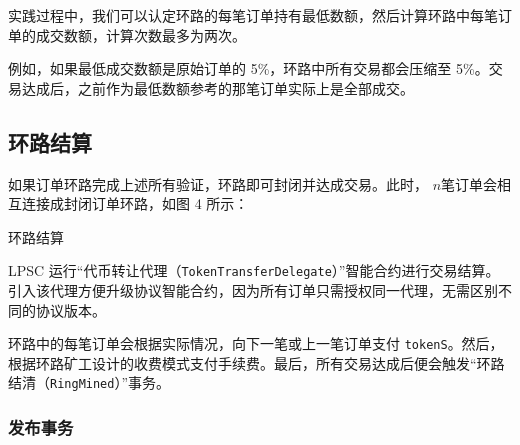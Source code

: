 \documentclass[UTF8,nofonts]{ctexart}%
\makeatletter
\newenvironment{figurehere}
 {\def\@captype{figure}}
 {}
\makeatother
\begin{document}
\begin{multicols}{2}
实践过程中，我们可以认定环路的每笔订单持有最低数额，然后计算环路中每笔订单的成交数额，计算次数最多为两次。

例如，如果最低成交数额是原始订单的 5\%，环路中所有交易都会压缩至 5\%。交易达成后，之前作为最低数额参考的那笔订单实际上是全部成交。


\subsection{环路结算\label{sec:settlement}}

如果订单环路完成上述所有验证，环路即可封闭并达成交易。此时， $n$笔订单会相互连接成封闭订单环路，如图 4 所示：

\begin{center}
\begin{figurehere}
\centering
{}
\caption{环路结算}
\label{fig:settlement}
\end{figurehere}
\end{center}

LPSC 运行“代币转让代理（\verb|TokenTransferDelegate|）”智能合约进行交易结算。引入该代理方便升级协议智能合约，因为所有订单只需授权同一代理，无需区别不同的协议版本。

环路中的每笔订单会根据实际情况，向下一笔或上一笔订单支付 \verb|tokenS|。然后，根据环路矿工设计的收费模式支付手续费。最后，所有交易达成后便会触发“环路结清（\verb|RingMined|）”事务。


\subsubsection{发布事务\label{sec:events}}


\end{multicols}
\end{document}
